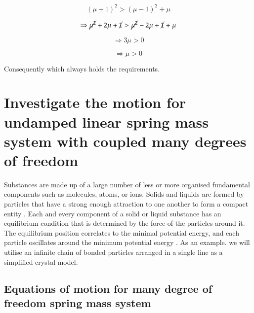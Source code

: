 \begin{equation}
    {\left( {\mu + 1} \right)^2} > {\left( {\mu - 1} \right)^2} + \mu 
\end{equation}

\begin{equation}
\Rightarrow \cancel{\mu ^2} + 2\mu + \cancel{1} > \cancel{\mu ^2} - 2\mu + \cancel{1} + \mu 
\end{equation}

\begin{equation}
    \Rightarrow 3\mu > 0 
\end{equation}

\begin{equation}
    \Rightarrow \mu > 0
\end{equation}

Consequently which always holds the requirements.



\section{Investigate the motion for undamped linear spring mass system with coupled many degrees of freedom}
\label{XY2}

\paragraph{}

Substances are made up of a large number of less or more organised fundamental components such as molecules, atoms, or ions. Solids and liquids are formed by particles that have a strong enough attraction to one another to form a compact entity \cite{chaudhari2016molecular}. Each and every component of a solid or liquid substance has an equilibrium condition that is determined by the force of the particles around it. The equilibrium position correlates to the minimal potential energy, and each particle oscillates around the minimum potential energy \cite{guvench2008comparison}. As an example. we will utilise an infinite chain of bonded particles arranged in a single line as a simplified crystal model.

\subsection{Equations of motion for many degree of freedom spring mass system}


